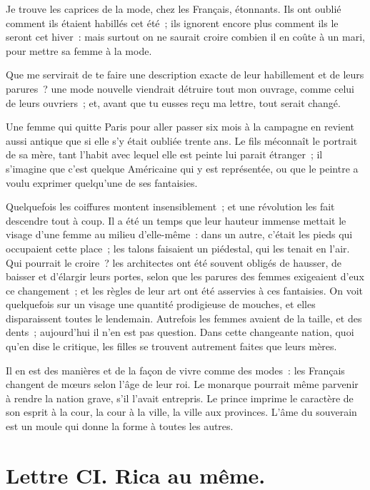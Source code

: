 \documentclass[french,twoside]{book} %
\newcommand{\dateline}[1]{\medskip{\RaggedLeft{#1}\par}\bigskip}
\begin{document}
\noindent Je trouve les caprices de la mode, chez les Français, étonnants. Ils ont oublié comment ils étaient habillés cet été ; ils ignorent encore plus comment ils le seront cet hiver : mais surtout on ne saurait croire combien il en coûte à un mari, pour mettre sa femme à la mode.\par
Que me servirait de te faire une description exacte de leur habillement et de leurs parures ? une mode nouvelle viendrait détruire tout mon ouvrage, comme celui de leurs ouvriers ; et, avant que tu eusses reçu ma lettre, tout serait changé.\par
Une femme qui quitte Paris pour aller passer six mois à la campagne en revient aussi antique que si elle s’y était oubliée trente ans. Le fils méconnaît le portrait de sa mère, tant l’habit avec lequel elle est peinte lui parait étranger ; il s’imagine que c’est quelque Américaine qui y est représentée, ou que le peintre a voulu exprimer quelqu’une de ses fantaisies.\par
Quelquefois les coiffures montent insensiblement ; et une révolution les fait descendre tout à coup. Il a été un temps que leur hauteur immense mettait le visage d’une femme au milieu d’elle-même : dans un autre, c’était les pieds qui occupaient cette place ; les talons faisaient un piédestal, qui les tenait en l’air. Qui pourrait le croire ? les architectes ont été souvent obligés de hausser, de baisser et d’élargir leurs portes, selon que les parures des femmes exigeaient d’eux ce changement ; et les règles de leur art ont été asservies à ces fantaisies. On voit quelquefois sur un visage une quantité prodigieuse de mouches, et elles disparaissent toutes le lendemain. Autrefois les femmes avaient de la taille, et des dents ; aujourd’hui il n’en est pas question. Dans cette changeante nation, quoi qu’en dise le critique, les filles se trouvent autrement faites que leurs mères.\par
Il en est des manières et de la façon de vivre comme des modes : les Français changent de mœurs selon l’âge de leur roi. Le monarque pourrait même parvenir à rendre la nation grave, s’il l’avait entrepris. Le prince imprime le caractère de son esprit à la cour, la cour à la ville, la ville aux provinces. L’âme du souverain est un moule qui donne la forme à toutes les autres.\par

\dateline{De Paris, le 8 de la lune de Saphar, 1717.}
\section[{Lettre CI. Rica au même.}]{Lettre CI. Rica au même.}\renewcommand{\leftmark}{Lettre CI. Rica au même.}
\end{document}
